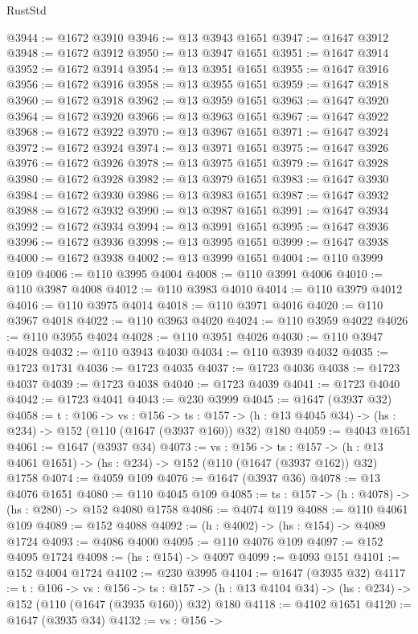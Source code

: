 \begin{lexlean}{RustStd}
\begin{coremodule}
@3944 := @1672 @3910
@3946 := @13 @3943 @1651
@3947 := @1647 @3912
@3948 := @1672 @3912
@3950 := @13 @3947 @1651
@3951 := @1647 @3914
@3952 := @1672 @3914
@3954 := @13 @3951 @1651
@3955 := @1647 @3916
@3956 := @1672 @3916
@3958 := @13 @3955 @1651
@3959 := @1647 @3918
@3960 := @1672 @3918
@3962 := @13 @3959 @1651
@3963 := @1647 @3920
@3964 := @1672 @3920
@3966 := @13 @3963 @1651
@3967 := @1647 @3922
@3968 := @1672 @3922
@3970 := @13 @3967 @1651
@3971 := @1647 @3924
@3972 := @1672 @3924
@3974 := @13 @3971 @1651
@3975 := @1647 @3926
@3976 := @1672 @3926
@3978 := @13 @3975 @1651
@3979 := @1647 @3928
@3980 := @1672 @3928
@3982 := @13 @3979 @1651
@3983 := @1647 @3930
@3984 := @1672 @3930
@3986 := @13 @3983 @1651
@3987 := @1647 @3932
@3988 := @1672 @3932
@3990 := @13 @3987 @1651
@3991 := @1647 @3934
@3992 := @1672 @3934
@3994 := @13 @3991 @1651
@3995 := @1647 @3936
@3996 := @1672 @3936
@3998 := @13 @3995 @1651
@3999 := @1647 @3938
@4000 := @1672 @3938
@4002 := @13 @3999 @1651
@4004 := @110 @3999 @109
@4006 := @110 @3995 @4004
@4008 := @110 @3991 @4006
@4010 := @110 @3987 @4008
@4012 := @110 @3983 @4010
@4014 := @110 @3979 @4012
@4016 := @110 @3975 @4014
@4018 := @110 @3971 @4016
@4020 := @110 @3967 @4018
@4022 := @110 @3963 @4020
@4024 := @110 @3959 @4022
@4026 := @110 @3955 @4024
@4028 := @110 @3951 @4026
@4030 := @110 @3947 @4028
@4032 := @110 @3943 @4030
@4034 := @110 @3939 @4032
@4035 := @1723 @1731
@4036 := @1723 @4035
@4037 := @1723 @4036
@4038 := @1723 @4037
@4039 := @1723 @4038
@4040 := @1723 @4039
@4041 := @1723 @4040
@4042 := @1723 @4041
@4043 := @230 @3999
@4045 := @1647 (@3937 @32)
@4058 := {t : @106} ->
  {vs : @156} ->
  {ts : @157} -> (h : @13 @4045 @34) -> (hs : @234) -> @152 (@110 (@1647 (@3937 @160)) @32) @180
@4059 := @4043 @1651
@4061 := @1647 (@3937 @34)
@4073 := {vs : @156} ->
  {ts : @157} -> (h : @13 @4061 @1651) -> (hs : @234) -> @152 (@110 (@1647 (@3937 @162)) @32) @1758
@4074 := @4059 @109
@4076 := @1647 (@3937 @36)
@4078 := @13 @4076 @1651
@4080 := @110 @4045 @109
@4085 := {ts : @157} -> (h : @4078) -> (hs : @280) -> @152 @4080 @1758
@4086 := @4074 @119
@4088 := @110 @4061 @109
@4089 := @152 @4088
@4092 := (h : @4002) -> (hs : @154) -> @4089 @1724
@4093 := @4086 @4000
@4095 := @110 @4076 @109
@4097 := @152 @4095 @1724
@4098 := (hs : @154) -> @4097
@4099 := @4093 @151
@4101 := @152 @4004 @1724
@4102 := @230 @3995
@4104 := @1647 (@3935 @32)
@4117 := {t : @106} ->
  {vs : @156} ->
  {ts : @157} -> (h : @13 @4104 @34) -> (hs : @234) -> @152 (@110 (@1647 (@3935 @160)) @32) @180
@4118 := @4102 @1651
@4120 := @1647 (@3935 @34)
@4132 := {vs : @156} ->

\end{coremodule}
\end{lexlean}

